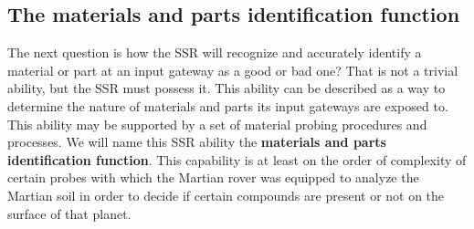 \documentclass[letterpaper]{article}
\begin{document}
\bigskip

\subsection[The materials and parts identification function]{The
materials and parts identification function}
\hypertarget{RefHeading3056306210128}{}The next question is how the SSR
will recognize and accurately identify a material or part at an input
gateway as a good or bad one? That is not a trivial ability, but the
SSR must possess it. This ability can be described as a way to
determine the nature of materials and parts its input gateways are
exposed to. This ability may be supported by a set of material probing
procedures and processes. We will name this SSR ability the
\textbf{materials and parts identification function}. This capability
is at least on the order of complexity of certain probes with which the
Martian rover was equipped to analyze the Martian soil in order to
decide if certain compounds are present or not on the surface of that
planet.


\bigskip
\end{document}
